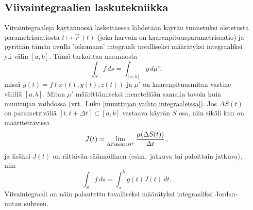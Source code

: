 \pagebreak
\subsection{Viivaintegraalien laskutekniikka}

Viivaintegraaleja käytännössä laskettaessa lähdetään käyrän tunnetuksi oletetusta 
parametrisaatiosta $t\mapsto\vec r\,(t)$ (joka harvoin on kaarenpituusparametrisaatio) ja 
pyritään tämän avulla 'oikomaan' integraali tavalliseksi määrätyksi integraaliksi yli 
välin $[a,b]$. Tämä tarkoittaa muunnosta
\[
\int_S f\,ds=\int_{[a,b]} g\,d\mu',
\]
missä $g(t)=f(x(t),y(t),z(t))$ ja $\mu'$ on kaarenpituusmitan vastine välillä $[a,b]$. Mitan
$\mu'$ määrittämiseksi menetellään samalla tavoin kuin muuttujan vaihdossa 
(vrt.\ Luku \ref{muuttujan vaihto integraaleissa}). Jos $\Delta S(t)$ on parametriväliä
$[t,t+\Delta t]\subset [a,b]$ vastaava käyrän $S$ osa, niin sikäli kun on määritettävissä
 
\[
J(t)=\lim_{\Delta t\kohti 0^+} \frac{\mu(\Delta S(t))}{\Delta t}\,,
\]
ja lisäksi $J(t)$ on riittävän säännöllinen (esim.\ jatkuva tai paloittain jatkuva), niin
\[
\int_S f\,ds=\int_a^b g(t)J(t)\,dt.
\]
Viivaintegraali on näin palautettu tavalliseksi määrätyksi integraaliksi Jordan-mitan suhteen.

